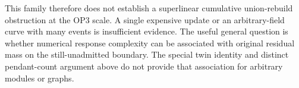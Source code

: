 This family therefore does not establish a superlinear cumulative
union-rebuild obstruction at the OP3 scale. A single expensive update or
an arbitrary-field curve with many events is insufficient evidence.
The useful general question is whether numerical response complexity can
be associated with original residual mass on the still-unadmitted
boundary. The special twin identity and distinct pendant-count argument
above do not provide that association for arbitrary modules or graphs.
